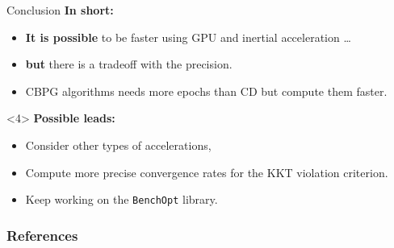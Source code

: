 \documentclass[10pt,aspectratio=43]{beamer}
\begin{document}
\begin{frame}{Conclusion}
\textbf{In short:}
\begin{itemize}
    \item \textbf{It is possible} to be faster using GPU and inertial
    acceleration \dots
    \item<2-> \textbf{but} there is a tradeoff with the precision.
    \item<3-> CBPG algorithms needs more epochs than CD but compute them faster.
\end{itemize}

\medskip
\begin{onlyenv}<4>
\textbf{Possible leads:}
\begin{itemize}
    \item Consider other types of accelerations,
    \item Compute more precise convergence rates for the KKT violation
    criterion.
    \item Keep working on the \texttt{BenchOpt} library.
\end{itemize}
\end{onlyenv}
\end{frame}


\begin{frame}[allowframebreaks]{}
    \frametitle{References}
    
\end{frame}

\begin{frame}
\end{frame}
\end{document}
